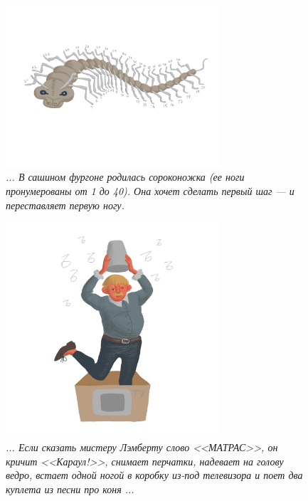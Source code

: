 \documentclass[10pt]{scrbook} \usepackage{modules/nonstahp_book}
\begin{document}
\begin{figure} \begin{center}
	\includegraphics[width=8cm]{figures/color/08}
	\caption{
             {\itshape ... В сашином фургоне родилась сороконожка (ее ноги пронумерованы от 1 до 40). 
              Она хочет сделать первый шаг — и переставляет первую ногу. 
             }\\
             }
\end{center} \end{figure}

\begin{figure} \begin{center}
	\includegraphics[width=8cm]{figures/color/09}
	\caption{
             {\itshape ... Если сказать мистеру Лэмберту слово <<МАТРАС>>, он кричит <<Караул!>>, 
              снимает перчатки, надевает на голову ведро, встает одной ногой в коробку 
              из-под телевизора и поет два куплета из песни про коня ...}\medskip\\
             }
\end{center} \end{figure}
\end{document}

